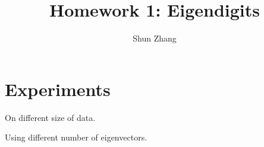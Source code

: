 \documentclass[10pt]{article}
\title{Homework 1: Eigendigits}
\author{Shun Zhang}
\date{}
\begin{document}
\maketitle

\section{Experiments}

On different size of data.

Using different number of eigenvectors.
\end{document}
